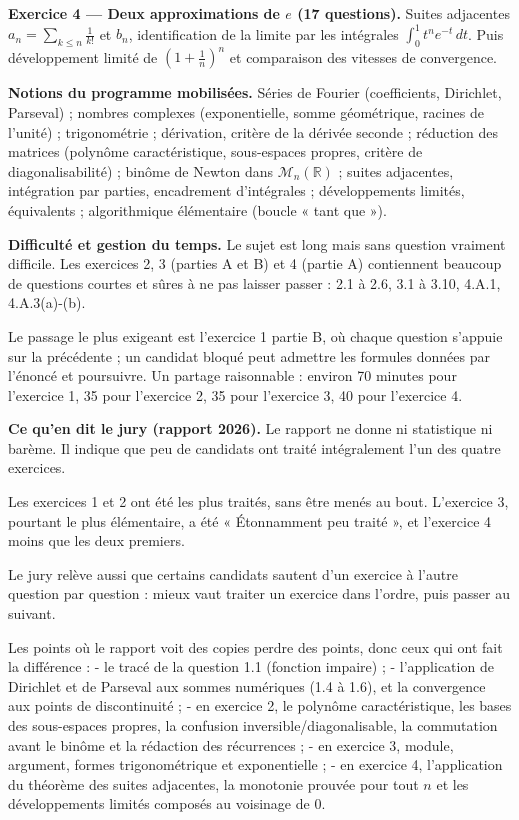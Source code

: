 \documentclass[11pt,a4paper]{article}
\begin{document}
\textbf{Exercice 4 --- Deux approximations de \(e\) (17 questions).} Suites adjacentes \(a_n=\sum_{k\le n}\frac1{k!}\) et \(b_n\), identification de la limite par les intégrales \(\int_0^1t^ne^{-t}\,dt\). Puis développement limité de \((1+\frac1n)^n\) et comparaison des vitesses de convergence.

\textbf{Notions du programme mobilisées.} Séries de Fourier (coefficients, Dirichlet, Parseval) ; nombres complexes (exponentielle, somme géométrique, racines de l'unité) ; trigonométrie ; dérivation, critère de la dérivée seconde ; réduction des matrices (polynôme caractéristique, sous-espaces propres, critère de diagonalisabilité) ; binôme de Newton dans \({\mathcal{M}}_n(\mathbb{R})\) ; suites adjacentes, intégration par parties, encadrement d'intégrales ; développements limités, équivalents ; algorithmique élémentaire (boucle « tant que »).

\textbf{Difficulté et gestion du temps.} Le sujet est long mais sans question vraiment difficile. Les exercices 2, 3 (parties A et B) et 4 (partie A) contiennent beaucoup de questions courtes et sûres à ne pas laisser passer : 2.1 à 2.6, 3.1 à 3.10, 4.A.1, 4.A.3(a)-(b).

Le passage le plus exigeant est l'exercice 1 partie B, où chaque question s'appuie sur la précédente ; un candidat bloqué peut admettre les formules données par l'énoncé et poursuivre. Un partage raisonnable : environ 70 minutes pour l'exercice 1, 35 pour l'exercice 2, 35 pour l'exercice 3, 40 pour l'exercice 4.

\textbf{Ce qu'en dit le jury (rapport 2026).} Le rapport ne donne ni statistique ni barème. Il indique que peu de candidats ont traité intégralement l'un des quatre exercices.

Les exercices 1 et 2 ont été les plus traités, sans être menés au bout. L'exercice 3, pourtant le plus élémentaire, a été « Étonnamment peu traité », et l'exercice 4 moins que les deux premiers.

Le jury relève aussi que certains candidats sautent d'un exercice à l'autre question par question : mieux vaut traiter un exercice dans l'ordre, puis passer au suivant.

Les points où le rapport voit des copies perdre des points, donc ceux qui ont fait la différence :
- le tracé de la question 1.1 (fonction impaire) ;
- l'application de Dirichlet et de Parseval aux sommes numériques (1.4 à 1.6), et la convergence aux points de discontinuité ;
- en exercice 2, le polynôme caractéristique, les bases des sous-espaces propres, la confusion inversible/diagonalisable, la commutation avant le binôme et la rédaction des récurrences ;
- en exercice 3, module, argument, formes trigonométrique et exponentielle ;
- en exercice 4, l'application du théorème des suites adjacentes, la monotonie prouvée pour tout \(n\) et les développements limités composés au voisinage de \(0\).
\end{document}
